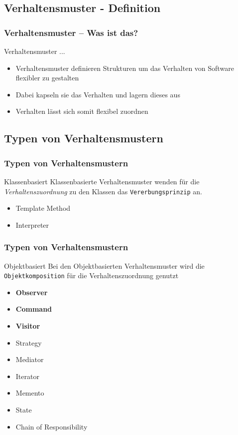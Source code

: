 \subsection{Verhaltensmuster - Definition}


\begin{frame}
	\frametitle{Verhaltensmuster -- Was ist das?}
	\begin{block}{Verhaltensmuster ...}
	\begin{itemize}
		\item Verhaltensmuster definieren Strukturen um das Verhalten von Software flexibler zu gestalten
		\item Dabei kapseln sie das Verhalten und lagern dieses aus
		\item Verhalten lässt sich somit flexibel zuordnen
	\end{itemize}
	\end{block}	
\end{frame}


\subsection{Typen von Verhaltensmustern}
\begin{frame}
	\frametitle{Typen von Verhaltensmustern}
	\begin{block}{Klassenbasiert}
		Klassenbasierte Verhaltensmuster wenden für die \textit{Verhaltenszuordnung} zu den Klassen das \texttt{Vererbungsprinzip} an. 
		\begin{itemize}
			\item Template Method
			\item Interpreter
		\end{itemize} 	
	\end{block}
\end{frame}

\begin{frame}
	\frametitle{Typen von Verhaltensmustern}
	\begin{block}{Objektbasiert}
		Bei den Objektbasierten Verhaltensmuster wird die \texttt{Objektkomposition} für die Verhaltenszuordnung genutzt
				\begin{itemize}
					\item \textbf{Observer}
					\item \textbf{Command}
					\item \textbf{Visitor}
					\item Strategy			
					\item Mediator
					\item Iterator
					\item Memento 
					\item State
					\item Chain of Responsibility
				\end{itemize}	
	\end{block}
\end{frame}

